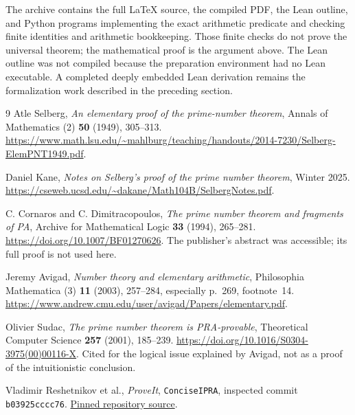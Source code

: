 \documentclass[11pt]{article}
\theoremstyle{definition}
\theoremstyle{remark}
\begin{document}
The archive contains the full LaTeX source, the compiled PDF, the Lean
outline, and Python programs implementing the exact arithmetic predicate
and checking finite identities and arithmetic bookkeeping. Those finite
checks do not prove the universal theorem; the mathematical proof is the
argument above. The Lean outline was not compiled because the preparation
environment had no Lean executable. A completed deeply embedded Lean
derivation remains the formalization work described in the preceding section.

\begin{thebibliography}{9}
Atle Selberg, \emph{An elementary proof of the prime-number theorem},
Annals of Mathematics (2) \textbf{50} (1949), 305--313.
\url{https://www.math.lsu.edu/~mahlburg/teaching/handouts/2014-7230/Selberg-ElemPNT1949.pdf}.

Daniel Kane, \emph{Notes on Selberg's proof of the prime number theorem},
Winter 2025.
\url{https://cseweb.ucsd.edu/~dakane/Math104B/SelbergNotes.pdf}.

C. Cornaros and C. Dimitracopoulos,
\emph{The prime number theorem and fragments of PA},
Archive for Mathematical Logic \textbf{33} (1994), 265--281.
\url{https://doi.org/10.1007/BF01270626}.
The publisher's abstract was accessible; its full proof is not used here.

Jeremy Avigad, \emph{Number theory and elementary arithmetic},
Philosophia Mathematica (3) \textbf{11} (2003), 257--284,
especially p.~269, footnote~14.
\url{https://www.andrew.cmu.edu/user/avigad/Papers/elementary.pdf}.

Olivier Sudac, \emph{The prime number theorem is PRA-provable},
Theoretical Computer Science \textbf{257} (2001), 185--239.
\url{https://doi.org/10.1016/S0304-3975(00)00116-X}.
Cited for the logical issue explained by Avigad, not as a proof of the
intuitionistic conclusion.

Vladimir Reshetnikov et al., \emph{ProveIt},
\texttt{ConciseIPRA}, inspected commit \texttt{b03925cccc76}.
\href{https://github.com/VladimirReshetnikov/ProveIt/tree/b03925cccc76d55b9dc2a00864a5e0544b64aa7f/Logic/PrimitiveRecursiveArithmetic/ConciseIPRA}{Pinned repository source}.
\end{thebibliography}
\end{document}
